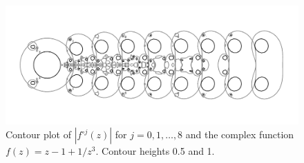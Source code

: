 \documentclass[12pt, a4paper]{amsart}
\begin{document}


\vfill
\pagebreak
\begin{figure}[!ht]
\includegraphics[width=230mm, angle=-90]{images/caterpillar.pdf}
\caption{
Contour plot of $|f^{\circ j}(z)|$ for $j = 0, 1, \ldots, 8$ and the complex function $f(z) = z - 1 + 1/z^3$.
Contour heights 0.5 and 1.
}
\end{figure}
\pagebreak
\end{document}
